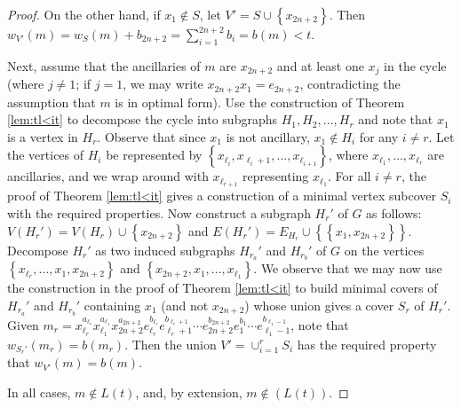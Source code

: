 \documentclass[12pt]{amsart}
\def\set#1{\left\{ {#1} \right\}}
\theoremstyle{plain}
\theoremstyle{definition}
\begin{document}
\begin{proof}
On the other hand, if $x_1\notin S$, let $V' = S\cup \set{x_{2n+2}}$.
Then $w_{V'}(m) = w_S(m) + b_{2n+2} = \sum_{i=1}^{2n+2} b_i = b(m) < t$.





Next, assume that the ancillaries of $m$ are $x_{2n+2}$ and at least one $x_j$ in the cycle (where $j\ne 1$; if $j= 1$, we may write $x_{2n+2} x_1 = e_{2n+2}$, contradicting the assumption that $m$ is in optimal form). %
Use the construction of Theorem \ref{lem:tl<it} to decompose the cycle into subgraphs $H_1, H_2, \ldots, H_r$ and note that $x_1$ is a vertex in $H_r$. 
Observe  that since $x_1$ is not ancillary, $x_1\notin H_i$ for any $i\ne r$.
Let the vertices of $H_i$ be represented by $\set{x_{\ell_{i}}, x_{\ell_{i}+1}, \ldots, x_{\ell_{i+1}}}$, where $x_{\ell_1}, \ldots, x_{\ell_r}$ are ancillaries, and we wrap around with $x_{\ell_{r+1}}$ representing $x_{\ell_1}$.
For all $i \ne r$, the proof of Theorem \ref{lem:tl<it} gives a construction of a minimal vertex subcover $S_i$ with the required properties.
Now construct a subgraph $H_r'$ of $G$ as follows: $V(H_r') = V(H_r) \cup \set{x_{2n+2}}$ and $E(H_r') = E_{H_r} \cup \set{\set{x_1, x_{2n+2}}}$.
Decompose $H_r'$ as two induced subgraphs $H_{r_a}'$ and $H_{r_b}'$ of $G$ on the vertices $\set{x_{\ell_r}, \ldots, x_1, x_{2n+2}}$ and $\set{x_{2n+2}, x_1, \ldots, x_{\ell_1}}$.
We observe that we may now use the construction in the proof of Theorem \ref{lem:tl<it} to build minimal covers of $H_{r_a}'$ and $H_{r_b}'$ containing $x_1$ (and not $x_{2n+2}$) whose union gives a cover $S_r$ of $H_r'$.
Given $m_r = x_{\ell_r}^{a_{\ell_r}} x_{\ell_{1}}^{a_{\ell_{1}}} x_{2n+2}^{a_{2n+2}} e_{\ell_r}^{b_{\ell_r}} e_{\ell_r+1}^{b_{\ell_r + 1}} \cdots e_{2n+2}^{b_{2n+2}} e_1^{b_1} \cdots e_{\ell_1-1}^{b_{\ell_1-1}}$, note that $w_{S_r'}(m_r) = b(m_r)$.
Then the union $V' = \cup_{i=1}^r S_i$ has the required property that $w_{V'}(m) = b(m)$.




In all cases, $m\notin L(t)$, and, by extension, $m\notin (L(t))$.

\end{proof}
\end{document}
